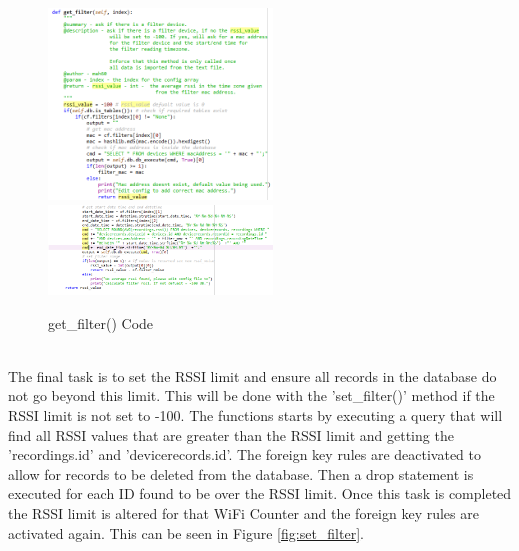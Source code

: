 \documentclass{report}
\begin{document}
\begin{figure}[h!]
    \centering
    \includegraphics[width=225]{get_filters.PNG}
    \includegraphics[width=225]{get_filters_2.PNG}
    \caption{get\_filter() Code}
    \label{fig:get_filter}
\end{figure} \\
The final task is to set the RSSI limit and ensure all records in the database do not go beyond this limit. This will be done with the 'set\_filter()' method if the RSSI limit is not set to -100. The functions starts by executing a query that will find all RSSI values that are greater than the RSSI limit and getting the 'recordings.id' and 'devicerecords.id'. The foreign key rules are deactivated to allow for records to be deleted from the database. Then a drop statement is executed for each ID found to be over the RSSI limit. Once this task is completed the RSSI limit is altered for that WiFi Counter and the foreign key rules are activated again. This can be seen in Figure \ref{fig:set_filter}.\\ \newline
\end{document}
